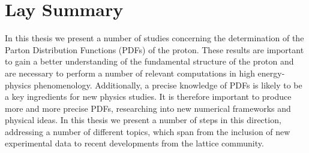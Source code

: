 \chapter*{Lay Summary}
In this thesis we present a number of studies concerning the determination of the
Parton Distribution Functions (PDFs) of the proton. These results are important to gain a better understanding 
of the fundamental structure of the proton and are necessary to perform a number of relevant computations
in high energy-physics phenomenology.
Additionally, a precise knowledge of PDFs is likely to be a key ingredients for new physics studies. 
It is therefore important to produce more and more precise PDFs,
researching into new numerical frameworks and physical ideas. 
In this thesis we present a number of steps in this direction, addressing a number of different topics,
which span from the inclusion of new experimental data to recent developments from the lattice community.


